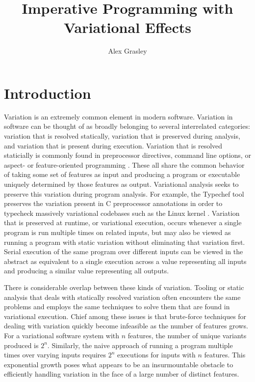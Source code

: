 \documentclass[12pt,oneside]{book}
\title{Imperative Programming with Variational Effects}
\author{Alex Grasley}
\begin{document}
\maketitle

\mainmatter

\chapter{Introduction}
\label{ch:intro}

Variation is an extremely common element in modern software. Variation in software can be
thought of as broadly belonging to several interrelated categories: variation that is resolved statically, variation that is preserved during analysis,
and variation that is present during execution.
Variation that is resolved staticially is commonly found in preprocessor directives, command line options, or aspect- or feature-oriented
programming \cite{apel2008feature,kiczales1997aspect,prehofer1997feature}.
These all share the common behavior of taking some set of features as input and
producing a program or executable uniquely determined by those features as output. Variational analysis seeks to preserve this variation during program analysis.
For example, the Typechef tool preserves the variation present in C preprocessor annotations in order to typecheck massively variational codebases such as
the Linux kernel \cite{kenner2010typechef}.
Variation that is preserved at runtime, or variational execution, occurs whenever a single
program is run multiple times on related inputs, but may also be viewed as running a program with static variation without eliminating that variation first.
Serial execution of the same program over different inputs can be viewed in the abstract
as equivalent to a single execution across a value representing all inputs and producing a similar value representing all outputs.

There is considerable overlap between these kinds of variation. Tooling or static analysis that deals with
statically resolved variation often encounters the same problems and employs the same techniques to solve them
that are found in variational execution. Chief among these issues is that brute-force techniques for dealing with variation quickly become infeasible as the
number of features grows. For a variational software system with $n$ features, the number of unique variants produced is $2^n$. Similarly, the naive approach
of running a program multiple times over varying inputs requires $2^n$ executions for inputs with $n$ features. This exponential growth poses what appears to
be an insurmountable obstacle to efficiently handling variation in the face of a large number of distinct features.
\end{document}
